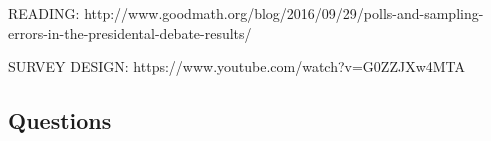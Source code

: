 



READING: http://www.goodmath.org/blog/2016/09/29/polls-and-sampling-errors-in-the-presidental-debate-results/

SURVEY DESIGN: https://www.youtube.com/watch?v=G0ZZJXw4MTA


\subsection*{Questions}



